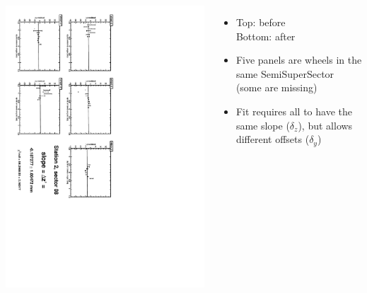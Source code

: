 \documentclass[compress]{beamer}
\begin{document}
\begin{frame}
\begin{columns}
\vfill
\includegraphics[height=\linewidth, angle=90]{zfits_after/zfit_2_08.pdf}
\begin{itemize}
\item Top: before \\ Bottom: after
\item Five panels are wheels in the same SemiSuperSector (some are missing)
\item Fit requires all to have the same slope ($\delta_z$), but allows different offsets ($\delta_y$)
\end{itemize}
\end{columns}
\end{frame}
\end{document}
